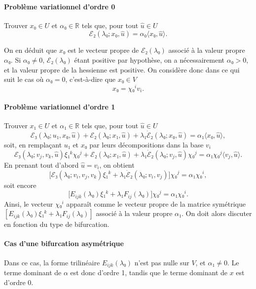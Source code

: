 \documentclass[12pt, final]{amsart}
\theoremstyle{definition}
\newcommand{\reals}{\mathbb{R}}
\begin{document}
\paragraph{Problème variationnel d'ordre 0} Trouver \(x₀∈U\) et \(α₀∈\reals\)
tels que, pour tout \(\hat{u}∈U\)
\begin{equation}
  ℰ₂(λ₀; x₀, \hat{u}) = α₀ 〈 x₀, \hat{u} 〉.
\end{equation}

On en déduit que \(x₀\) est le vecteur propre de \(ℰ₂(λ₀)\) associé à la valeur
propre \(α₀\). Si \(α₀ \neq 0\), \(ℰ₂ (λ₀)\) étant positive par hypothèse, on a
nécessairement \(α₀ > 0\), et la valeur propre de la hessienne est positive. On
considère donc dans ce qui suit le cas où \(α₀ = 0\), c'est-à-dire que \(x₀∈V\)
\begin{equation}
  x₀ = χ₀^i v_i.
\end{equation}

\paragraph{Problème variationnel d'ordre 1} Trouver \(x₁∈U\) et \(α₁∈\reals\)
tels que, pour tout \(\hat{u}∈U\)
\begin{equation}
  ℰ₃(λ₀; u₁, x₀, \hat{u}) + ℰ₂(λ₀ ; x₁, \hat{u}) + λ₁ \dot{ℰ}₂(λ₀; x₀, \hat{u}) = α₁ 〈 x₀, \hat{u} 〉,
\end{equation}
soit, en remplaçant \(u₁\) et \(x₀\) par leurs décompositions dans la base \(v_i\)
\begin{equation}
  ℰ₃(λ₀; v_j, v_k, \hat{u}) ξ₁^k χ₀^j + ℰ₂(λ₀; x₁, \hat{u}) + λ₁ \dot{ℰ}₂(λ₀; v_j, \hat{u}) χ₀^j = α₁ χ₀^j 〈 v_j, \hat{u} 〉.
\end{equation}
En prenant tout d'abord \(\hat{u} = v_i\), on obtient
\begin{equation}
  \bigl[ℰ₃(λ₀; v_i, v_j, v_k) ξ₁^k + λ₁ \dot{ℰ}₂(λ₀; v_i, v_j)\bigr] χ₀^j = α₁ χ₀^i,
\end{equation}
soit encore
\begin{equation}
  \bigl[E_{i j k}(λ₀) ξ₁^k + λ₁ F_{i j}(λ₀)\bigr] χ₀^j = α₁ χ₀^i.
\end{equation}
Ainsi, le vecteur \(χ₀^i\) apparaît comme le vecteur propre de la matrice
symétrique \([E_{i j k}(λ₀) ξ₁^k + λ₁ F_{i j}(λ₀)]\) associé à la valeur propre
\(α₁\). On doit alors discuter en fonction du type de bifurcation.

\paragraph{Cas d'une bifurcation asymétrique} Dans ce cas, la forme trilinéaire
\(E_{i j k}(λ₀)\) n'est pas nulle sur \(V\), et \(α₁ \neq 0\). Le terme dominant
de \(α\) est donc d'ordre 1, tandis que le terme dominant de \(x\) est d'ordre
0.
\end{document}
